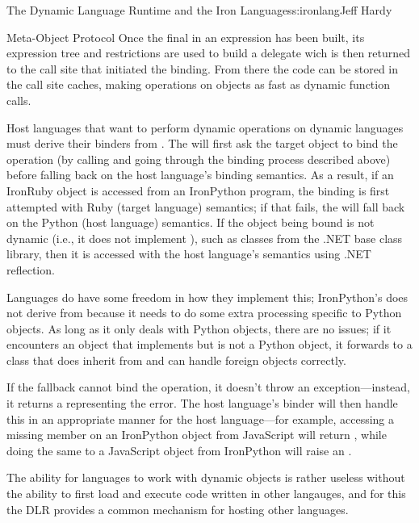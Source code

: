 \begin{aosachapter}{The Dynamic Language Runtime and the Iron Languages}{s:ironlang}{Jeff Hardy}
\begin{aosasect1}{Meta-Object Protocol}
Once the final  in an expression has been
built, its expression tree and restrictions are used to build a
delegate wich is then returned to the call site that initiated the
binding. From there the code can be stored in the call site caches,
making operations on objects as fast as dynamic function calls.

Host languages that want to perform dynamic operations on dynamic
languages must derive their binders from
. The 
will first ask the target object to bind the operation (by calling
 and going through the binding process described
above) before falling back on the host language's binding
semantics. As a result, if an IronRuby object is accessed from an
IronPython program, the binding is first attempted with Ruby (target
language) semantics; if that fails, the 
will fall back on the Python (host language) semantics. If the object
being bound is not dynamic (i.e., it does not implement
), such as classes from the .NET base
class library, then it is accessed with the host language's semantics
using .NET reflection.

Languages do have some freedom in how they implement this;
IronPython's  does not derive from
 because it needs to do some extra processing
specific to Python objects. As long as it only deals with Python
objects, there are no issues; if it encounters an object that
implements  but is not a Python
object, it forwards to a  class that
does inherit from  and can handle foreign objects
correctly.

If the fallback cannot bind the operation, it doesn't throw an
exception---instead, it returns a 
representing the error. The host language's binder will then handle
this in an appropriate manner for the host language---for example,
accessing a missing member on an IronPython object from JavaScript
will return , while doing the same to a JavaScript
object from IronPython will raise an .

The ability for languages to work with dynamic objects is rather
useless without the ability to first load and execute code written in
other langauges, and for this the DLR provides a common mechanism for
hosting other languages.


\end{aosasect1}
\end{aosachapter}
